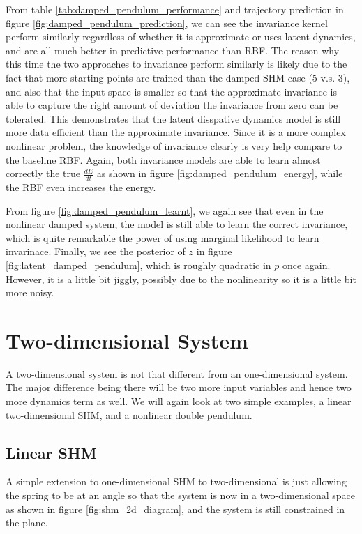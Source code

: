 \documentclass{statsmsc}
\begin{document}
From table \ref{tab:damped_pendulum_performance} and trajectory prediction in figure \ref{fig:damped_pendulum_prediction}, we can see the invariance kernel perform similarly regardless of whether it is approximate or uses latent dynamics, and are all much better in predictive performance than RBF.
The reason why this time the two approaches to invariance perform similarly is likely due to the fact that more starting points are trained than the damped SHM case (5 v.s. 3), and also that the input space is smaller so that the approximate invariance is able to capture the right amount of deviation the invariance from zero can be tolerated.
This demonstrates that the latent disspative dynamics model is still more data efficient than the approximate invariance.
Since it is a more complex nonlinear problem, the knowledge of invariance clearly is very help compare to the baseline RBF.
Again, both invariance models are able to learn almost correctly the true $\frac{dE}{dt}$ as shown in figure \ref{fig:damped_pendulum_energy}, while the RBF even increases the energy.

From figure \ref{fig:damped_pendulum_learnt}, we again see that even in the nonlinear damped system, the model is still able to learn the correct invariance, which is quite remarkable the power of using marginal likelihood to learn invarinace. 
Finally, we see the posterior of $z$ in figure \ref{fig:latent_damped_pendulum}, which is roughly quadratic in $p$ once again. 
However, it is a little bit jiggly, possibly due to the nonlinearity so it is a little bit more noisy.


\section{Two-dimensional System}
A two-dimensional system is not that different from an one-dimensional system. The major difference being there will be two more input variables and hence two more dynamics term as well. 
We will again look at two simple examples, a linear two-dimensional SHM, and a nonlinear double pendulum.

\subsection{Linear SHM}
A simple extension to one-dimensional SHM to two-dimensional is just allowing the spring to be at an angle so that the system is now in a two-dimensional space as shown in figure \ref{fig:shm_2d_diagram}, and the system is still constrained in the plane.
\end{document}
